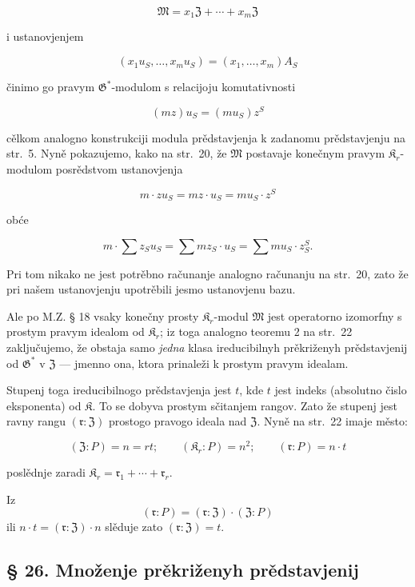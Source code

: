 \documentclass[11pt]{article}
\begin{document}
\[\mathfrak{M}=x_1\mathfrak{Z}+\cdots+x_m\mathfrak{Z}\]

i ustanovjenjem

\[(x_1u_S,\ldots,x_mu_S)=(x_1,\ldots,x_m)A_S\]

činimo go pravym \(\mathfrak G^*\)-modulom s relacijoju komutativnosti

\[(mz) u_S = (mu_S) z^S\]

cělkom analogno konstrukciji modula prědstavjenja k zadanomu prědstavjenju na str.~5. Nyně pokazujemo, kako na str.~20, že \(\mathfrak{M}\) postavaje konečnym pravym \(\mathfrak K_r\)-modulom posrědstvom ustanovjenja

\[m \cdot z u_S = mz \cdot u_S = mu_S \cdot z^S\]

obće

\[m \cdot \sum z_S u_S = \sum m z_S \cdot u_S = \sum m u_S \cdot z_S^S.\]

Pri tom nikako ne jest potrěbno računanje analogno računanju na str.~20, zato že pri našem ustanovjenju upotrěbili jesmo ustanovjenu bazu.

Ale po M.Z. § 18 vsaky konečny prosty \(\mathfrak K_r\)-modul \(\mathfrak{M}\) jest operatorno izomorfny s prostym pravym idealom od \(\mathfrak K_r\); iz toga analogno teoremu 2 na str.~22 zaključujemo, že obstaja samo \emph{jedna} klasa ireducibilnyh prěkriženyh prědstavjenij od \(\mathfrak{G}^*\) v \(\mathfrak Z\) --- jmenno ona, ktora prinaleži k prostym pravym idealam.

Stupenj toga ireducibilnogo prědstavjenja jest \(t\), kde \(t\) jest indeks (absolutno čislo eksponenta) od \(\mathfrak K\). To se dobyva prostym sčitanjem rangov. Zato že stupenj jest ravny rangu \((\mathfrak r:\mathfrak Z)\) prostogo pravogo ideala nad \(\mathfrak Z\). Nyně na str.~22 imaje město:

\[
(\mathfrak Z:P)=n=rt;\qquad (\mathfrak K_r:P)=n^2;\qquad (\mathfrak r:P)=n\cdot t
\]

poslědnje zaradi \(\mathfrak K_r = \mathfrak{r}_1 + \cdots + \mathfrak{r}_r\).

Iz
\[(\mathfrak{r}: P) = (\mathfrak{r}: \mathfrak Z) \cdot (\mathfrak Z: P)\]
ili \(n \cdot t = (\mathfrak{r}: \mathfrak Z) \cdot n\) slěduje zato \((\mathfrak{r}: \mathfrak Z) = t\).

\subsection*{§ 26. Množenje prěkriženyh prědstavjenij}\label{multiplikation-der-verschraenkten-darstellungen}
\end{document}
